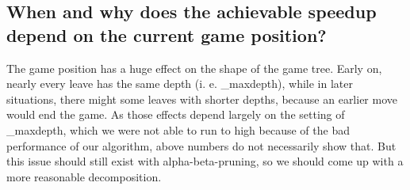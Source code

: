 \subsection*{When and why does the achievable speedup depend on the current game position?}
The game position has a huge effect on the shape of the game tree. Early on, nearly every leave has the same depth (i. e. \_maxdepth), while in later situations, there might some leaves with shorter depths, because an earlier move would end the game. As those effects depend largely on the setting of \_maxdepth, which we were not able to run to high because of the bad performance of our algorithm, above numbers do not necessarily show that. But this issue should still exist with alpha-beta-pruning, so we should come up with a more reasonable decomposition.
